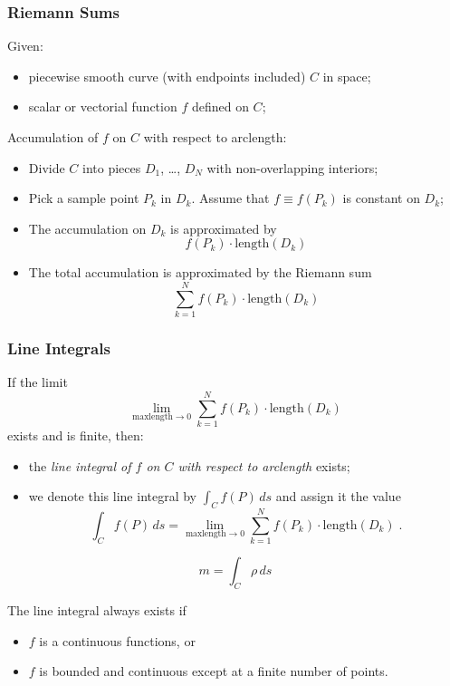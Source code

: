 \begin{frame}
  \frametitle{Riemann Sums}
  Given:
  \begin{itemize}
    \item piecewise smooth curve (with endpoints included) $C$ in space;
    \item scalar  or vectorial function $f$ defined on $C$;
  \end{itemize}

\pause  Accumulation of $f$ on $C$ with respect to arclength:

  \begin{itemize}
    \item \pause Divide $C$ into pieces $D_1$, \ldots, $D_N$ with non-overlapping interiors;
    \item \pause Pick a sample point $P_k$ in $D_k$. Assume that $f \equiv f(P_k)$ is constant on $D_k$;
    \item \pause The accumulation on $D_k$ is approximated by
    $$f(P_k) \cdot \text{length}(D_k)$$
    \item \pause The total accumulation is \textcolor[rgb]{0.98,0.00,0.00}{approximated} by the Riemann sum
  $$\sum_{k=1}^N f(P_k) \cdot \text{length}(D_k)$$
  \end{itemize}
\end{frame}

\begin{frame}
    \frametitle{Line Integrals}

If the limit
%
$$\lim_{\text{maxlength} \to 0} \sum_{k=1}^N f(P_k) \cdot \text{length}(D_k)$$
%
exists and is finite, then:

\begin{itemize}
   \item \pause the \emph{line integral of $f$ on $C$ with respect to arclength} exists;
   \item \pause we denote this line integral by $\int_C f(P) \, ds$ \pause and assign it the value
   $$\int_C f(P) \, ds =\lim_{\text{maxlength} \to 0} \sum_{k=1}^N f(P_k) \cdot \text{length}(D_k)\; .$$
 \end{itemize}
%
$$m = \int_C \rho \, ds$$
%

\pause The line integral always exists if
\begin{itemize}
  \item \pause $f$ is a continuous functions, or
  \item \pause $f$ is bounded and continuous except at a finite number of points.
\end{itemize}

\end{frame}

